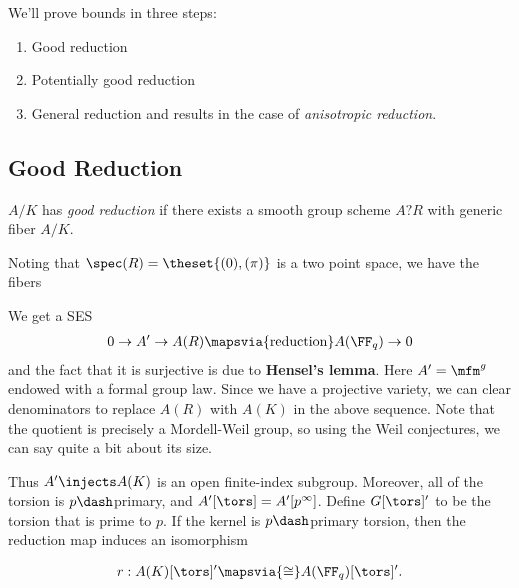 We'll prove bounds in three steps:

\begin{enumerate}
\def\labelenumi{\arabic{enumi}.}
\tightlist
\item
  Good reduction
\item
  Potentially good reduction
\item
  General reduction and results in the case of \emph{anisotropic
  reduction}.
\end{enumerate}

\hypertarget{good-reduction}{%
\subsection{Good Reduction}\label{good-reduction}}

\begin{description}
\tightlist
\item[Definition (Good Reduction for Abelian Varieties)]
\(A/K\) has \emph{good reduction} if there exists a smooth group scheme
\(A?R\) with generic fiber \(A/K\).
\end{description}

Noting that \(\spec(R) = \theset{(0), (\pi)}\) is a two point space, we
have the fibers

\begin{center}\end{center}

We get a SES
\begin{align*}
0 \to A' \to A(R) \mapsvia{\text{reduction}} A(\FF_q) \to 0
\end{align*} and the fact that it is surjective is due to
\textbf{Hensel's lemma}. Here \(A' = \mfm^g\) endowed with a formal
group law. Since we have a projective variety, we can clear denominators
to replace \(A(R)\) with \(A(K)\) in the above sequence. Note that the
quotient is precisely a Mordell-Weil group, so using the Weil
conjectures, we can say quite a bit about its size.

Thus \(A' \injects A(K)\) is an open finite-index subgroup. Moreover,
all of the torsion is \(p\dash\)primary, and
\(A'[\tors] = A'[p^\infty]\). Define \(G[\tors]'\) to be the torsion
that is prime to \(p\). If the kernel is \(p\dash\)primary torsion, then
the reduction map induces an isomorphism

\begin{align*}
r: A(K)[\tors]' \mapsvia{\cong} A(\FF_q)[\tors]'
.\end{align*}

